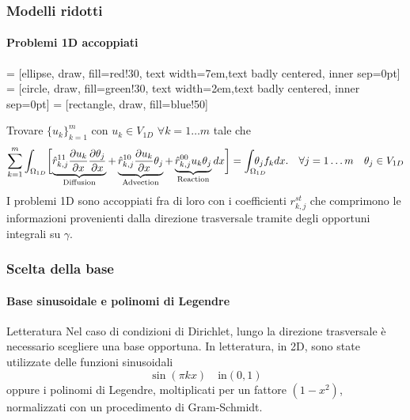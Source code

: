  \begin{frame}
  \frametitle{Modelli ridotti}
  \framesubtitle{Problemi 1D accoppiati}
 \begin{center}
   = [ellipse, draw, fill=red!30, 
    text width=7em,text badly centered, inner sep=0pt]
   = [circle, draw, fill=green!30, 
    text width=2em,text badly centered, inner sep=0pt]
    = [rectangle, draw, fill=blue!50]
 \end{center}
Trovare $\{u_k\}_{k=1}^m$ con $u_k\in V_{1D}\,\,\forall k=1\ldots m$ tale che
  {\footnotesize
\begin{equation}
\label{eq:modalreducedcoeff}
 \sum_{k=1}^m\int_{\Omega_{1D}}
 \biggl[
 \underbrace{\hat r^{11}_{k,j}\dpar{ u_k}{x}\dpar{\theta_j}{x}}_{\text{Diffusion}}
+\underbrace{\hat r^{10}_{k,j}\dpar{ u_k}{x}\theta_j}_{\text{Advection}}
+\underbrace{\hat r^{00}_{k,j} u_k\theta_j}_{\text{Reaction}}
dx\biggr]=\int_{\Omega_{1D}}\nsp{8}\theta_j f_k dx. \quad	\forall j=1\ldots m\quad \theta_j\in V_{1D} 
\end{equation}}
 I problemi 1D sono accoppiati fra di loro con i coefficienti $r^{st}_{k,j}$ che comprimono
 le informazioni provenienti dalla direzione trasversale tramite degli opportuni integrali su $\gamma$.
 \end{frame}
 
\begin{frame}
 \frametitle{Scelta della base}
 \framesubtitle{Base sinusoidale e polinomi di Legendre}
 \begin{exampleblock}{Letteratura}
 Nel caso di condizioni di Dirichlet, lungo la direzione trasversale \`e necessario scegliere una base opportuna.
 In letteratura, in 2D, sono state utilizzate delle funzioni sinusoidali
 $$\sin(\pi k x)\quad \text{in}(0,1)$$
 oppure i polinomi di Legendre, moltiplicati per un fattore $(1-x^2)$, normalizzati
 con un procedimento di Gram-Schmidt.
\end{exampleblock}
\end{frame}

